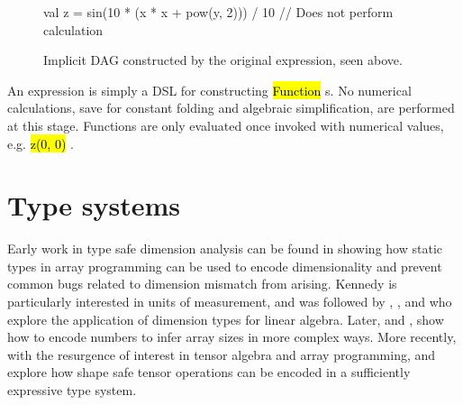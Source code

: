 \documentclass[12pt,initial,twoside,maitrise]{dms}
\newcommand{\inline}[1]{%
\begingroup%
\sethlcolor{slightgray}%
\hl{\ttfamily\small #1}%
\endgroup
}
\numberwithin{equation}{section}
\numberwithin{table}{chapter}
\numberwithin{figure}{chapter}
\begin{document}
%
\begin{figure}
\begin{unbreakablelisting}
val z = sin(10 * (x * x + pow(y, 2))) / 10 // Does not perform calculation
\end{unbreakablelisting}
\centering
{}
\caption{Implicit DAG constructed by the original expression, seen above.}
    \label{lst:edsl}
\end{figure}

An expression is simply a DSL for constructing \inline{Function}s. No numerical calculations, save for constant folding and algebraic simplification, are performed at this stage. Functions are only evaluated once invoked with numerical values, e.g. \inline{z(0, 0)}.

\section{Type systems}\label{sec:type-systems}

Early work in type safe dimension analysis can be found in \citet{kennedy1994dimension, kennedy1996programming} showing how static types in array programming can be used to encode dimensionality and prevent common bugs related to dimension mismatch from arising. Kennedy is particularly interested in units of measurement, and was followed by \citet{jay1996shape}, \citet{rittri1995dimension}, and \citet{zenger1997indexed} who explore the application of dimension types for linear algebra. Later, \citet{kiselyov2005number, kiselyov2010fun} and \citet{griffioen2015type}, show how to encode numbers to infer array sizes in more complex ways. More recently, with the resurgence of interest in tensor algebra and array programming, \citet{chen2017typesafe} and \citet{rink2018modeling} explore how shape safe tensor operations can be encoded in a sufficiently expressive type system.
\end{document}
